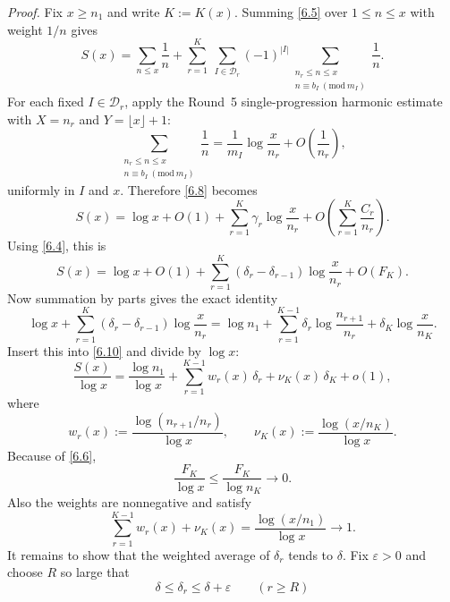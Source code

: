 \emph{Proof.}
Fix $x\ge n_1$ and write $K:=K(x)$.  Summing \eqref{6.5} over $1\le n\le x$ with weight $1/n$ gives
\begin{equation}
S(x)
=
\sum_{n\le x}\frac1n
+
\sum_{r=1}^{K}\ \sum_{I\in\mathcal D_r} (-1)^{|I|}
\sum_{\substack{n_r\le n\le x\\ n\equiv b_I\ (\mathrm{mod}\ m_I)}}\frac1n.
\tag{6.8}
\end{equation}
For each fixed $I\in\mathcal D_r$, apply the Round~5 single-progression harmonic estimate with $X=n_r$ and $Y=\lfloor x\rfloor+1$:
\[
\sum_{\substack{n_r\le n\le x\\ n\equiv b_I\ (\mathrm{mod}\ m_I)}}\frac1n
=
\frac1{m_I}\log\frac{x}{n_r}+O\!\left(\frac1{n_r}\right),
\]
uniformly in $I$ and $x$.  Therefore \eqref{6.8} becomes
\begin{equation}
S(x)
=
\log x+O(1)
+
\sum_{r=1}^{K}\gamma_r\log\frac{x}{n_r}
+
O\!\left(\sum_{r=1}^{K}\frac{C_r}{n_r}\right).
\tag{6.9}
\end{equation}
Using \eqref{6.4}, this is
\begin{equation}
S(x)
=
\log x+O(1)
+
\sum_{r=1}^{K}(\delta_r-\delta_{r-1})\log\frac{x}{n_r}
+
O(F_K).
\tag{6.10}
\end{equation}
Now summation by parts gives the exact identity
\begin{equation}
\log x+
\sum_{r=1}^{K}(\delta_r-\delta_{r-1})\log\frac{x}{n_r}
=
\log n_1
+
\sum_{r=1}^{K-1}\delta_r\log\frac{n_{r+1}}{n_r}
+
\delta_K\log\frac{x}{n_K}.
\tag{6.11}
\end{equation}
Insert this into \eqref{6.10} and divide by $\log x$:
\begin{equation}
\frac{S(x)}{\log x}
=
\frac{\log n_1}{\log x}
+
\sum_{r=1}^{K-1}w_r(x)\,\delta_r
+
\nu_K(x)\,\delta_K
+
o(1),
\tag{6.12}
\end{equation}
where
\begin{equation}
w_r(x):=\frac{\log(n_{r+1}/n_r)}{\log x},
\qquad
\nu_K(x):=\frac{\log(x/n_K)}{\log x}.
\tag{6.13}
\end{equation}
Because of \eqref{6.6},
\[
\frac{F_K}{\log x}\le \frac{F_K}{\log n_K}\to 0.
\]
Also the weights are nonnegative and satisfy
\begin{equation}
\sum_{r=1}^{K-1}w_r(x)+\nu_K(x)=\frac{\log(x/n_1)}{\log x}\longrightarrow 1.
\tag{6.14}
\end{equation}
It remains to show that the weighted average of $\delta_r$ tends to $\delta$.  Fix $\varepsilon>0$ and choose $R$ so large that
\[
\delta\le \delta_r\le \delta+\varepsilon\qquad(r\ge R)
\]
